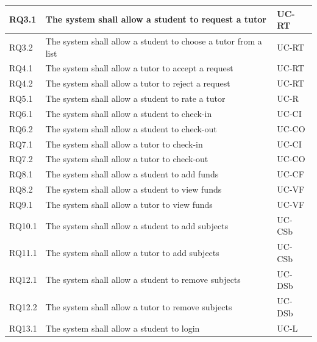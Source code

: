 \documentclass[12pt]{article}
\begin{document}
{\begin{longtable}{| l | p{10cm}| l |}
				RQ3.1 & The system shall allow a student to request a tutor & UC-RT \\ \hline
				RQ3.2 & The system shall allow a student to choose a tutor from a list & UC-RT \\ \hline

				RQ4.1 & The system shall allow a tutor to accept a request & UC-RT \\ \hline
				RQ4.2 & The system shall allow a tutor to reject a request & UC-RT \\ \hline




				RQ5.1 & The system shall allow a student to rate a tutor & UC-R\\ \hline

				RQ6.1 & The system shall allow a student to check-in  & UC-CI \\ \hline
				RQ6.2 & The system shall allow a student to check-out  & UC-CO \\ \hline
				RQ7.1 & The system shall allow a tutor to check-in  & UC-CI \\
\hline
				RQ7.2 & The system shall allow a tutor to check-out  & UC-CO \\ \hline
				RQ8.1 & The system shall allow a student to add funds &UC-CF\\ \hline
				RQ8.2 & The system shall allow a student to view funds &UC-VF\\ \hline
				RQ9.1 & The system shall allow a tutor to view funds &UC-VF\\ \hline
				RQ10.1 & The system shall allow a student to add subjects &UC-CSb\\ \hline
				RQ11.1 & The system shall allow a tutor to add subjects &UC-CSb\\ \hline
				RQ12.1 & The system shall allow a student to remove subjects &UC-DSb\\ \hline
				RQ12.2 & The system shall allow a tutor to remove subjects &UC-DSb\\ \hline
				RQ13.1 & The system shall allow a student to login &UC-L\\ \hline

\end{longtable}}
\end{document}
